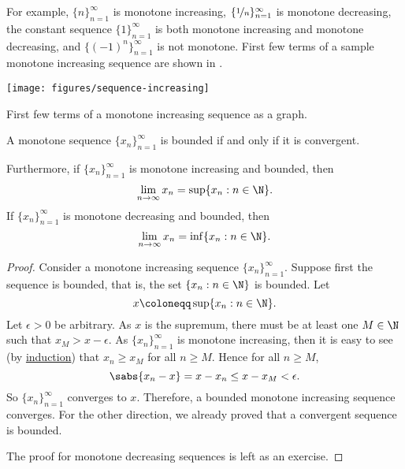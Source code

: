 For example,
$\{ n \}_{n=1}^\infty$ is monotone increasing,
$\{ \nicefrac{1}{n} \}_{n=1}^\infty$ is monotone decreasing,
the constant sequence $\{ 1 \}_{n=1}^\infty$ is both monotone increasing and monotone
decreasing, and $\bigl\{ {(-1)}^n \bigr\}_{n=1}^\infty$ is not monotone.
First few terms of a sample monotone increasing sequence
are shown in 
.

\begin{myfigureht}
\texttt{[image: figures/sequence-increasing]}
\caption{First few terms of a monotone increasing sequence as a
graph.\label{figsequenceincreasing}}
\end{myfigureht}

\begin{thm} \label{thm:monotoneconv}
%
A monotone sequence $\{ x_n \}_{n=1}^\infty$ is bounded if and only if it is convergent.

Furthermore, if $\{ x_n \}_{n=1}^\infty$ is monotone increasing and bounded, then
\begin{equation*}
\lim_{n\to \infty} x_n = \sup \{ x_n : n \in \N \} .
\end{equation*}
If $\{ x_n \}_{n=1}^\infty$ is monotone decreasing and bounded, then
\begin{equation*}
\lim_{n\to \infty} x_n = \inf \{ x_n : n \in \N \} .
\end{equation*}
\end{thm}

\begin{proof}
Consider a monotone increasing sequence $\{ x_n \}_{n=1}^\infty$.  Suppose 
first the sequence is bounded,
that is,
the set $\{ x_n : n \in  \N \}$ is bounded.  Let
\begin{equation*}
x \coloneqq \sup \{ x_n : n \in \N \} .
\end{equation*}
Let $\epsilon > 0$ be arbitrary.  As $x$ is the supremum,
there must be at least one $M \in \N$ such that $x_{M} > x-\epsilon$.
As $\{ x_n \}_{n=1}^\infty$ is monotone increasing,
then it is easy to see (by \hyperref[induction:thm]{induction}) that
$x_n \geq x_{M}$ for all $n \geq M$.  Hence for all $n \geq M$,
\begin{equation*}
\sabs{x_n-x} = x-x_n \leq x-x_{M} < \epsilon  .
\end{equation*}
So $\{ x_n \}_{n=1}^\infty$ converges to $x$.
Therefore, a bounded monotone increasing sequence converges.
For the other direction, we already proved that a convergent sequence
is bounded.

The proof for monotone decreasing sequences is left as an exercise.
\end{proof}

